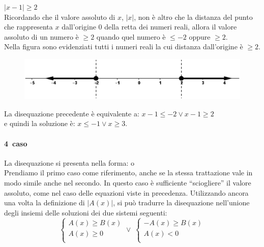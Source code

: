 \begin{esempio} \(|x-1|\geq 2\)\\[4pt] Ricordando che il valore 
assoluto di \(x\), \(|x|\), non è altro che la distanza del punto che rappresenta 
\(x\) dall'origine 0 della retta dei numeri reali, allora il valore assoluto di 
un numero è \(\geq 2\) quando quel numero è \(\leq -2\) oppure \(\geq 2\).\\
        Nella figura sono evidenziati tutti i numeri reali la cui distanza 
dall'origine è \(\geq 2\).
\begin{figure}[h]
\begin{center}
\begin{inaccessibleblock}[TODO]
\centering
\includegraphics[width=0.7\linewidth]{img/imm5} %
\end{inaccessibleblock}
\label{fig:abs_imm5}
\end{center}
\end{figure}
La disequazione precedente è equivalente a: \(x-1\leq -2 \vee x-1 \geq 2\) \\[4pt]
e quindi la soluzione è: \(x\leq -1 \vee x\geq 3.\)
\end{esempio}

\paragraph{4\textdegree~caso} La disequazione si presenta nella forma:  
 o \\[4pt]
Prendiamo il primo caso come riferimento, anche se la stessa trattazione vale in modo simile anche nel secondo.
In questo caso è sufficiente ``sciogliere'' il valore assoluto, come nel caso delle equazioni viste in precedenza.
Utilizzando ancora una volta la definizione di \(|A(x)|\), si può tradurre la disequazione
nell'unione degli insiemi delle soluzioni dei due sistemi seguenti:
\[
\left\lbrace 
\begin{array}{l}
A(x)\geq B(x)\\
A(x)\geq 0\\
\end{array}
\right.
\vee \;
\left\lbrace 
\begin{array}{l}
-A(x)\geq B(x)\\
A(x)< 0\\
\end{array}
\right.
\]


